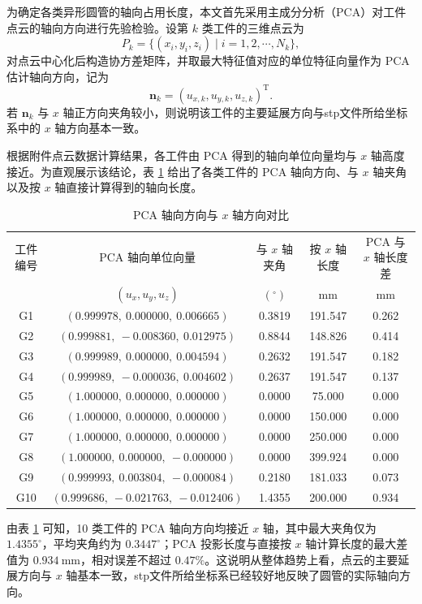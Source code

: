 \documentclass[UTF8]{ctexart}
\begin{document}
为确定各类异形圆管的轴向占用长度，本文首先采用主成分分析（PCA）对工件点云的轴向方向进行先验检验。设第 $k$ 类工件的三维点云为
\[
P_k=\{(x_i,y_i,z_i)\mid i=1,2,\cdots,N_k\},
\]
对点云中心化后构造协方差矩阵，并取最大特征值对应的单位特征向量作为 PCA 估计轴向方向，记为
\[
\boldsymbol n_k=(u_{x,k},u_{y,k},u_{z,k})^{\mathrm T}.
\]
若 $\boldsymbol n_k$ 与 $x$ 轴正方向夹角较小，则说明该工件的主要延展方向与stp文件所给坐标系中的 $x$ 轴方向基本一致。

根据附件点云数据计算结果，各工件由 PCA 得到的轴向单位向量均与 $x$ 轴高度接近。为直观展示该结论，表 \ref{tab:pca_axis_check} 给出了各类工件的 PCA 轴向方向、与 $x$ 轴夹角以及按 $x$ 轴直接计算得到的轴向长度。

\begin{table}[htbp]
\centering
\caption{PCA 轴向方向与 $x$ 轴方向对比}
\label{tab:pca_axis_check}
\begin{tabular}{ccccc}
\toprule
工件编号 & PCA 轴向单位向量  & 与 $x$ 轴夹角& 按 $x$ 轴长度& PCA 与 $x$ 轴长度差 \\
&$(u_x,u_y,u_z)$&$(^\circ)$ &mm &mm \\
\midrule
G1  & $(0.999978,\ 0.000000,\ 0.006665)$ & 0.3819 & 191.547 & 0.262 \\
G2  & $(0.999881,\ -0.008360,\ 0.012975)$ & 0.8844 & 148.826 & 0.414 \\
G3  & $(0.999989,\ 0.000000,\ 0.004594)$ & 0.2632 & 191.547 & 0.182 \\
G4  & $(0.999989,\ -0.000036,\ 0.004602)$ & 0.2637 & 191.547 & 0.137 \\
G5  & $(1.000000,\ 0.000000,\ 0.000000)$ & 0.0000 & 75.000  & 0.000 \\
G6  & $(1.000000,\ 0.000000,\ 0.000000)$ & 0.0000 & 150.000 & 0.000 \\
G7  & $(1.000000,\ 0.000000,\ 0.000000)$ & 0.0000 & 250.000 & 0.000 \\
G8  & $(1.000000,\ 0.000000,\ -0.000000)$ & 0.0000 & 399.924 & 0.000 \\
G9  & $(0.999993,\ 0.003804,\ -0.000084)$ & 0.2180 & 181.033 & 0.073 \\
G10 & $(0.999686,\ -0.021763,\ -0.012406)$ & 1.4355 & 200.000 & 0.934 \\
\bottomrule
\end{tabular}
\end{table}

由表 \ref{tab:pca_axis_check} 可知，10 类工件的 PCA 轴向方向均接近 $x$ 轴，其中最大夹角仅为 $1.4355^\circ$，平均夹角约为 $0.3447^\circ$；PCA 投影长度与直接按 $x$ 轴计算长度的最大差值为 $0.934\ \mathrm{mm}$，相对误差不超过 $0.47\%$。这说明从整体趋势上看，点云的主要延展方向与 $x$ 轴基本一致，stp文件所给坐标系已经较好地反映了圆管的实际轴向方向。
\end{document}

